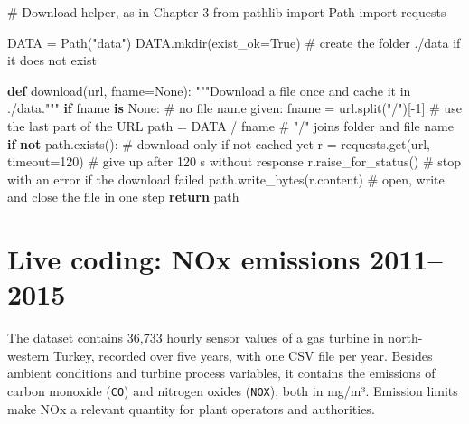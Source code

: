 \documentclass[
  letterpaper,
  DIV=11,
  numbers=noendperiod]{scrreprt}
\newenvironment{Shaded}{\begin{snugshade}}{\end{snugshade}}
\newcommand{\CommentTok}[1]{\textcolor[rgb]{0.37,0.37,0.37}{#1}}
\newcommand{\ControlFlowTok}[1]{\textcolor[rgb]{0.00,0.23,0.31}{\textbf{#1}}}
\newcommand{\DecValTok}[1]{\textcolor[rgb]{0.68,0.00,0.00}{#1}}
\newcommand{\ImportTok}[1]{\textcolor[rgb]{0.00,0.46,0.62}{#1}}
\newcommand{\KeywordTok}[1]{\textcolor[rgb]{0.00,0.23,0.31}{\textbf{#1}}}
\newcommand{\NormalTok}[1]{\textcolor[rgb]{0.00,0.23,0.31}{#1}}
\newcommand{\OperatorTok}[1]{\textcolor[rgb]{0.37,0.37,0.37}{#1}}
\newcommand{\StringTok}[1]{\textcolor[rgb]{0.13,0.47,0.30}{#1}}
\newcommand{\VariableTok}[1]{\textcolor[rgb]{0.07,0.07,0.07}{#1}}
\begin{document}
\begin{Shaded}
\begin{Highlighting}[]
\CommentTok{\# Download helper, as in Chapter 3}
\ImportTok{from}\NormalTok{ pathlib }\ImportTok{import}\NormalTok{ Path}
\ImportTok{import}\NormalTok{ requests}

\NormalTok{DATA }\OperatorTok{=}\NormalTok{ Path(}\StringTok{"data"}\NormalTok{)}
\NormalTok{DATA.mkdir(exist\_ok}\OperatorTok{=}\VariableTok{True}\NormalTok{)                         }\CommentTok{\# create the folder ./data if it does not exist}

\KeywordTok{def}\NormalTok{ download(url, fname}\OperatorTok{=}\VariableTok{None}\NormalTok{):}
    \CommentTok{"""Download a file once and cache it in ./data."""}
    \ControlFlowTok{if}\NormalTok{ fname }\KeywordTok{is} \VariableTok{None}\NormalTok{:                             }\CommentTok{\# no file name given:}
\NormalTok{        fname }\OperatorTok{=}\NormalTok{ url.split(}\StringTok{"/"}\NormalTok{)[}\OperatorTok{{-}}\DecValTok{1}\NormalTok{]                }\CommentTok{\# use the last part of the URL}
\NormalTok{    path }\OperatorTok{=}\NormalTok{ DATA }\OperatorTok{/}\NormalTok{ fname                           }\CommentTok{\# "/" joins folder and file name}
    \ControlFlowTok{if} \KeywordTok{not}\NormalTok{ path.exists():                         }\CommentTok{\# download only if not cached yet}
\NormalTok{        r }\OperatorTok{=}\NormalTok{ requests.get(url, timeout}\OperatorTok{=}\DecValTok{120}\NormalTok{)        }\CommentTok{\# give up after 120 s without response}
\NormalTok{        r.raise\_for\_status()                      }\CommentTok{\# stop with an error if the download failed}
\NormalTok{        path.write\_bytes(r.content)               }\CommentTok{\# open, write and close the file in one step}
    \ControlFlowTok{return}\NormalTok{ path}
\end{Highlighting}
\end{Shaded}

\section{Live coding: NOx emissions
2011--2015}\label{live-coding-nox-emissions-20112015}

The dataset contains 36,733 hourly sensor values of a gas turbine in
north-western Turkey, recorded over five years, with one CSV file per
year. Besides ambient conditions and turbine process variables, it
contains the emissions of carbon monoxide (\texttt{CO}) and nitrogen
oxides (\texttt{NOX}), both in mg/m³. Emission limits make NOx a
relevant quantity for plant operators and authorities.
\end{document}
